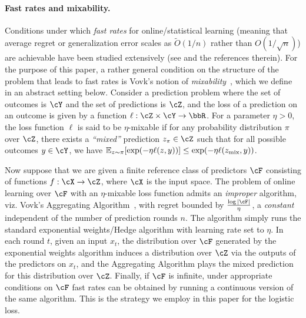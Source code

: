\paragraph{Fast rates and mixability.} Conditions under which \emph{fast rates} for online/statistical learning (meaning that average regret or generalization error scales as $\tilde{O}(1/n)$ rather than $O(1/\sqrt{n})$) are achievable have been studied extensively (see \citep{van2015fast} and the references therein). For the purpose of this paper, a rather general condition on the structure of the problem that leads to fast rates is Vovk's notion of \emph{mixability}~\citep{vovk1995game}, which we define in an abstract setting below. Consider a prediction problem where the set of outcomes is $\cY$ and the set of predictions is $\cZ$, and the loss of a prediction on an outcome is given by a function $\ell: \cZ \times \cY \rightarrow \R$. For a parameter $\eta > 0$, the loss function $\ell$ is said to be $\eta$-mixable if for any probability distribution $\pi$ over $\cZ$, there exists a \emph{``mixed''} prediction $z_\pi \in \cZ$ such that for all possible outcomes $y \in \cY$, we have $\operatorname*{\mathbb{E}}_{z \sim \pi}[\exp(-\eta \ell(z, y))] \leq \exp(-\eta \ell(z_\text{mix}, y))$.

Now suppose that we are given a finite reference class of predictors $\cF$ consisting of functions $f: \cX \rightarrow \cZ$, where $\cX$ is the input space. The problem of online learning over $\cF$ with an $\eta$-mixable loss function admits an \emph{improper} algorithm, viz. Vovk's Aggregating Algorithm~\citep{vovk1995game}, with regret bounded by $\frac{\log|\cF|}{\eta}$, a \emph{constant} independent of the number of prediction rounds $n$. The algorithm simply runs the standard exponential weights/Hedge algorithm \citep{PLG} with learning rate set to $\eta$. In each round $t$, given an input $x_t$, the distribution over $\cF$ generated by the exponential weights algorithm induces a distribution over $\cZ$ via the outputs of the predictors on $x_t$, and the Aggregating Algorithm plays the mixed prediction for this distribution over $\cZ$. Finally, if $\cF$ is infinite, under appropriate conditions on $\cF$ fast rates can be obtained by running a continuous version of the same algorithm. This is the strategy we employ in this paper for the logistic loss.


